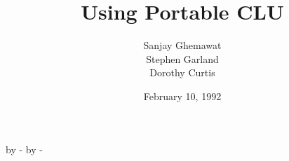 
\topmargin 0pt
\advance \topmargin by -\headheight
\advance \topmargin by -\headsep
\textheight 8.9in
\oddsidemargin 0pt
\evensidemargin \oddsidemargin
\marginparwidth 0.5in
\textwidth 6.5in

\newenvironment{indenttext}{%
\begin{list}{}{%
\leftmargin=0.5in%
\rightmargin=0in%
\labelsep=0pt%
\labelwidth=0pt%
\listparindent=\parindent%
}%
\item%
}{%
\end{list}%
}

\newenvironment{syntax}{%
\subsection*{\hspace{0.25in}Syntax}%
\begin{indenttext}
}{%
\end{indenttext}%
}

\newenvironment{overview}{%
\subsection*{\hspace{0.25in}Overview}%
\begin{indenttext}
}{%
\end{indenttext}%
}

\newenvironment{options}{%
\subsection*{\hspace{0.25in}Options}%
\begin{indenttext}
\begin{tabular}{@{\hspace{\tabcolsep}\tt}lp{4.4in}}%
}{%
\end{tabular}%
\end{indenttext}%
}

\newenvironment{comments}{%
\subsection*{\hspace{0.25in}Comments}%
\begin{indenttext}
}{%
\end{indenttext}%
}

\title{Using Portable CLU}
\date{February 10, 1992}
\author{Sanjay Ghemawat\\Stephen Garland\\Dorothy Curtis}



